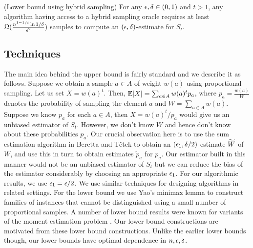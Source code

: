 \begin{thm}(Lower bound using hybrid sampling) For any $\epsilon,\delta \in (0,1)$ and $t>1$, any algorithm having access to a hybrid sampling oracle requires at least $\Omega(\frac{n^{1-1/t}\ln 1/\delta}{\epsilon^2})$ samples to compute an $(\epsilon,\delta)$-estimate for $S_t$. \end{thm}


\subsection{Techniques} The main idea behind the upper bound is fairly standard and we describe it as follows. Suppose we obtain a sample $a\in A$ of weight $w(a)$ using proportional sampling. Let us set $X=w(a)^t$. Then, $\mathbb{E}[X]=\sum_{a\in A} w(a)^t p_a$, where $p_a=\frac{w(a)}{W}$ denotes the probability of sampling the element $a$ and $W=\sum_{a\in A} w(a)$. Suppose we know $p_a$ for each $a\in A$, then $X=w(a)^t/p_a$ would give us an unbiased estimator of $S_t$. However, we don't know $W$ and hence don't know about these probabilities $p_a$. Our crucial observation here is to use the sum estimation algorithm in Beretta and T{\v{e}}tek \cite{BT2022} to obtain an $(\epsilon_1,\delta/2)$ estimate $\widetilde{W}$ of $W$, and use this in turn to obtain estimates $\tilde{p}_a$ for $p_a$. Our estimator built in this manner would not be an unbiased estimator of $S_t$ but we can reduce the bias of the estimator considerably by choosing an appropriate $\epsilon_1$. For our algorithmic results, we use $\epsilon_1=\epsilon/2$. We use similar techniques for designing algorithms in related settings. For the lower bound we use Yao's minimax lemma to construct families of instances that cannot be distinguished using a small number of proportional samples. A number of lower bound results were known for variants of the moment estimation problem \cite{GRS2011,ERS2018,ABGPRY2018}. Our lower bound constructions are motivated from these lower bound constructions. Unlike the earlier lower bounds though, our lower bounds have optimal dependence in $n,\epsilon,\delta$. 


